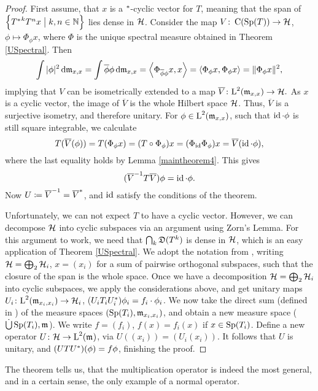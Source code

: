 \begin{proof}
 

First assume, that $x$ is a $^{*}$-cyclic vector for $T$, meaning that 
the span of $\left\lbrace {T^{*}} ^k T^n x\bigm | k,n \in \mathbb{N} \right\rbrace$ lies dense in $\mathcal{H}$. 
Consider the map $V\colon\operatorname{C}(\operatorname{Sp}(T)) \to \mathcal{H}$, 
$\phi \mapsto \Phi_\phi x$, where $\Phi$ is the unique spectral 
measure obtained in Theorem \ref{USpectral}. Then
\begin{gather*}
 \int |\phi|^2 \operatorname{d}\! \mathfrak{m}_{x,x} = \int \overline{\phi}\phi \operatorname{d}\! \mathfrak{m}_{x,x}
 = \left\langle \Phi_{\overline{\phi} \phi} x, x \right\rangle= \left\langle \Phi_\phi x, \Phi_\phi x \right\rangle 
 = \|\Phi_\phi x \|^2,
\end{gather*}
implying that $V$ can be isometrically extended to a map 
$\overline{V}\colon \text{L}^2(\mathfrak{m}_{x,x}) \to \mathcal{H}.$ As $x$ is a cyclic vector, 
the image of $\overline{V}$ is the whole Hilbert space $\mathcal{H}$. Thus, 
$\overline{V}$ is a surjective isometry, and therefore unitary. For
$\phi \in \text{L}^2(\mathfrak{m}_{x,x})$, such that $\operatorname{id} \cdot \phi$ is still 
square integrable, we calculate
\[
 T(\overline{V}(\phi))= T(\Phi_\phi x) = (T\circ \Phi_\phi)x = (\Phi_{\operatorname{id}} \Phi_\phi) x
 = \overline{V}(\operatorname{id} \cdot \phi),
\]
where the last equality holds by Lemma \ref{maintheorem4}. This gives
\[
 (\overline{V}^{-1} T \overline{V})\phi = \operatorname{id} \cdot \phi.
\]
Now $U\coloneqq  \overline{V}^{-1} = \overline{V}^{*}$, and $\operatorname{id}$ satisfy 
the conditions of the theorem.

Unfortunately, we can not expect $T$ to have a cyclic vector. However, we can 
decompose $\mathcal{H}$ into cyclic subspaces via an argument using Zorn's Lemma.
For this argument to work, we need that $\bigcap_k \mathfrak{D}(T^k)$ is dense in $\mathcal{H}$,
which is an easy application of Theorem \ref{USpectral}.
We adopt the notation from \cite[pp. 337]{WernerFunkAna}, writing
$\mathcal{H} = \bigoplus_2 \mathcal{H}_i$, $x = (x_i)$ for a sum of pairwise orthogonal subspaces, such that
the closure of the span is the whole space. Once we have a decomposition
$\mathcal{H} = \bigoplus_2 \mathcal{H}_i$ into cyclic subspaces, we apply the 
considerations above, and get
unitary maps $U_i \colon \text{L}^2(\mathfrak{m}_{x_i, x_i}) \to \mathcal{H}_i$, 
($U_i T_i U_i ^{*})\phi_i = f_i \cdot \phi_i$. We now take the direct sum
(defined in \cite[214L]{FremMeasureTheo}) of the measure spaces $(\operatorname{Sp}(T_i), \mathfrak{m}_{x_i,x_i})$,
and obtain a new measure space ($\dot\bigcup \operatorname{Sp}(T_i),\mathfrak{m}_{}$).
We write $f = (f_i)$, $f(x) = f_i(x)$ if $x \in \operatorname{Sp}(T_i)$. 
Define a new operator $U\colon\mathcal{H} \to \text{L}^2(\mathfrak{m}_{})$, via 
$U((x_i)) = (U_i(x_i))$. It follows that $U$ is unitary, and 
$(UTU^{*})(\phi) = f\phi$, finishing the proof.
\end{proof}

The theorem tells us, that the multiplication operator is indeed 
the most general, and in a certain sense, the only example of a normal
operator.























